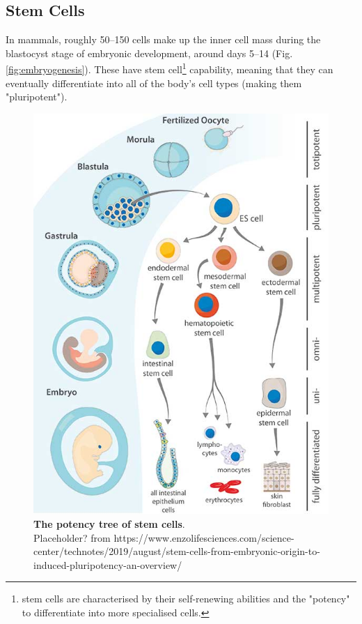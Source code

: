 \subsection{Stem Cells}

In mammals, roughly 50–150 cells make up the inner cell mass during the blastocyst stage of embryonic development, around days 5–14 (Fig. \ref{fig:embryogenesis}). 
These have stem cell\footnote{stem cells are characterised by their self-renewing abilities and the "potency" to differentiate into more specialised cells.} capability, meaning that they can eventually differentiate into all of the body's cell types (making them "pluripotent").

\begin{figure}[htbp]
\centering
\includegraphics[width=13cm]{Chapter1/Fig/stem_cells.jpg}
\caption[Stem Cells]{\textbf{The potency tree of stem cells}.\\
Placeholder? from https://www.enzolifesciences.com/science-center/technotes/2019/august/stem-cells-from-embryonic-origin-to-induced-pluripotency-an-overview/}
\label{fig:stem_cells}
\end{figure}


